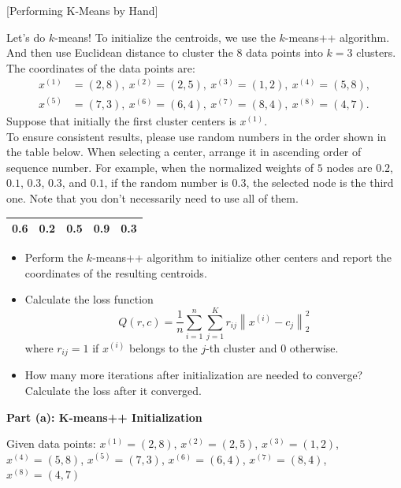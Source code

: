 \item {} [Performing K-Means by Hand]

Let's do $k$-means! To initialize the centroids, we use the $k$-means++ algorithm. And then use Euclidean distance to cluster the 8 data points into $k=3$ clusters. The coordinates of the data points are:
\begin{align*}
    x^{(1)} & = (2,8),  \ x^{(2)} = (2,5), \ x^{(3)} = (1,2), \ x^{(4)} = (5,8), \\
    x^{(5)} & = (7,3),  \ x^{(6)} = (6,4), \ x^{(7)} = (8,4), \ x^{(8)} = (4,7).
\end{align*}
Suppose that initially the first cluster centers is $x^{(1)}$. \\
{\color{blue} To ensure consistent results, please use random numbers in the order shown in the table below. When selecting a center, arrange it in ascending order of sequence number. For example, when the normalized weights of $5$ nodes are $0.2$, $0.1$, $0.3$, $0.3$, and $0.1$, if the random number is $0.3$, the selected node is the third one. Note that you don't necessarily need to use all of them.}
\begin{table}[h]
    \centering
    \begin{tabular}{|c|c|c|c|c|}
    \hline
    0.6 & 0.2 & 0.5 & 0.9 & 0.3 \\
    \hline
    \end{tabular}
\end{table}

\begin{itemize}
\item[(a)] Perform the $k$-means++ algorithm to initialize other centers and report the coordinates of the resulting centroids. ~
\item[(b)] Calculate the loss function
$$Q(r,c) = \dfrac{1}{n} \sum_{i=1}^n \sum_{j=1}^K r_{ij}\left\|x^{(i)} - c_j\right\|_2^2$$
where $r_{ij} = 1$ if $x^{(i)}$ belongs to the $j$-th cluster and 0 otherwise. ~
\item[(c)] How many more iterations after initialization are needed to converge? ~ Calculate the loss after it converged. ~
\end{itemize}


\solution

\textbf{Part (a): K-means++ Initialization}

Given data points:
$x^{(1)} = (2,8)$, $x^{(2)} = (2,5)$, $x^{(3)} = (1,2)$, $x^{(4)} = (5,8)$,
$x^{(5)} = (7,3)$, $x^{(6)} = (6,4)$, $x^{(7)} = (8,4)$, $x^{(8)} = (4,7)$

